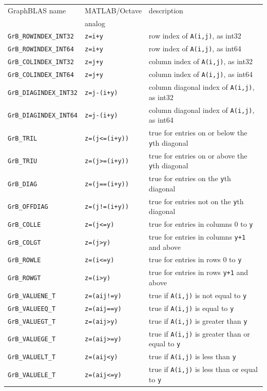 \vspace{0.2in}
\noindent
{\footnotesize
\begin{tabular}{lll}
\hline
GraphBLAS name          & MATLAB/Octave     & description \\
                        & analog            & \\
\hline
\verb'GrB_ROWINDEX_INT32'  & \verb'z=i+y'       & row index of \verb'A(i,j)', as int32 \\
\verb'GrB_ROWINDEX_INT64'  & \verb'z=i+y'       & row index of \verb'A(i,j)', as int64 \\
\verb'GrB_COLINDEX_INT32'  & \verb'z=j+y'       & column index of \verb'A(i,j)', as int32 \\
\verb'GrB_COLINDEX_INT64'  & \verb'z=j+y'       & column index of \verb'A(i,j)', as int64 \\
\verb'GrB_DIAGINDEX_INT32' & \verb'z=j-(i+y)'   & column diagonal index of \verb'A(i,j)', as int32 \\
\verb'GrB_DIAGINDEX_INT64' & \verb'z=j-(i+y)'   & column diagonal index of \verb'A(i,j)', as int64 \\
\hline
\verb'GrB_TRIL'    & \verb'z=(j<=(i+y))'  & true for entries on or below the \verb'y'th diagonal \\
\verb'GrB_TRIU'    & \verb'z=(j>=(i+y))'  & true for entries on or above the \verb'y'th diagonal \\
\verb'GrB_DIAG'    & \verb'z=(j==(i+y))'  & true for entries on the \verb'y'th diagonal \\
\verb'GrB_OFFDIAG' & \verb'z=(j!=(i+y))'  & true for entries not on the \verb'y'th diagonal \\
\verb'GrB_COLLE'   & \verb'z=(j<=y)'      & true for entries in columns 0 to \verb'y' \\
\verb'GrB_COLGT'   & \verb'z=(j>y)'       & true for entries in columns \verb'y+1' and above \\
\verb'GrB_ROWLE'   & \verb'z=(i<=y)'      & true for entries in rows 0 to \verb'y' \\
\verb'GrB_ROWGT'   & \verb'z=(i>y)'       & true for entries in rows \verb'y+1' and above \\
\hline
\verb'GrB_VALUENE_T'     & \verb'z=(aij!=y)'    & true if \verb'A(i,j)' is not equal to \verb'y'\\
\verb'GrB_VALUEEQ_T'     & \verb'z=(aij==y)'    & true if \verb'A(i,j)' is equal to \verb'y'\\
\verb'GrB_VALUEGT_T'     & \verb'z=(aij>y)'     & true if \verb'A(i,j)' is greater than \verb'y' \\
\verb'GrB_VALUEGE_T'     & \verb'z=(aij>=y)'    & true if \verb'A(i,j)' is greater than or equal to \verb'y' \\
\verb'GrB_VALUELT_T'     & \verb'z=(aij<y)'     & true if \verb'A(i,j)' is less than \verb'y' \\
\verb'GrB_VALUELE_T'     & \verb'z=(aij<=y)'    & true if \verb'A(i,j)' is less than or equal to \verb'y' \\
%
\hline
\end{tabular}
}
\vspace{0.2in}


